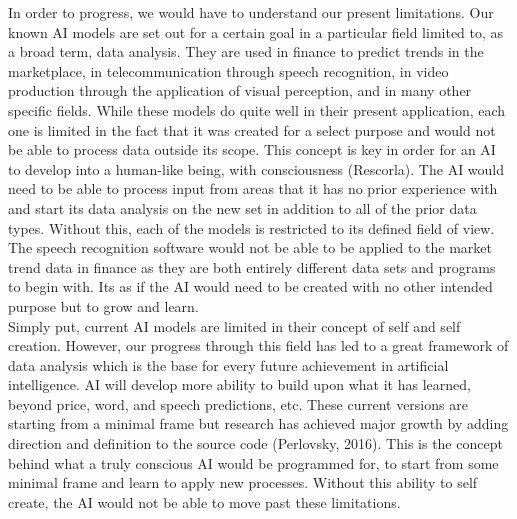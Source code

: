 \documentclass[11pt]{article}
\theoremstyle{plain}
\begin{document}
In order to progress, we would have to understand our present limitations. Our known AI models are set out for a certain goal in a particular field limited to, as a broad term, data analysis. They are used in finance to predict trends in the marketplace, in telecommunication through speech recognition, in video production through the application of visual perception, and in many other specific fields. While these models do quite well in their present application, each one is limited in the fact that it was created for a select purpose and would not be able to process data outside its scope. This concept is key in order for an AI to develop into a human-like being, with consciousness (Rescorla). The AI would need to be able to process input from areas that it has no prior experience with and start its data analysis on the new set in addition to all of the prior data types. Without this, each of the models is restricted to its defined field of view. The speech recognition software would not be able to be applied to the market trend data in finance as they are both entirely different data sets and programs to begin with. Its as if the AI would need to be created with no other intended purpose but to grow and learn. \\

Simply put, current AI models are limited in their concept of self and self creation. However, our progress through this field has led to a great framework of data analysis which is the base for every future achievement in artificial intelligence. AI will develop more ability to build upon what it has learned, beyond price, word, and speech predictions, etc. These current versions are starting from a minimal frame but research has achieved major growth by adding direction and definition to the source code (Perlovsky, 2016). This is the concept behind what a truly conscious AI would be programmed for, to start from some minimal frame and learn to apply new processes. Without this ability to self create, the AI would not be able to move past these limitations.\\
\end{document}
